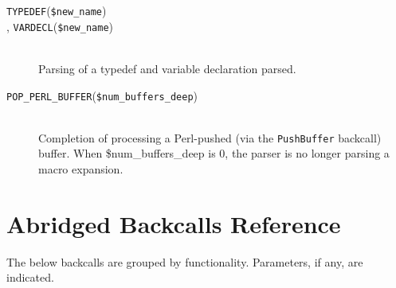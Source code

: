 \documentclass{article}
\newcommand{\Perl}{\mbox{Perl}}
\newcommand{\hook}[2]{\texttt{#1}(\texttt{#2}) \\ }
\newcommand{\shook}[1]{\texttt{#1}}
\begin{document}
\begin{description}

\item[\hook{TYPEDEF}{\$new\_\-name}, \hook{VARDECL}{\$new\_\-name}] ~ \\
  Parsing of a typedef and variable declaration parsed.

\item[\hook{POP\_PERL\_BUFFER}{\$num\_\-buffers\_\-deep}] ~ \\
  Completion of processing a \Perl{}-pushed (via the \texttt{PushBuffer}
  backcall) buffer.  When \$num\_\-buffers\_\-deep is 0, the parser is no 
  longer parsing a macro expansion.

\end{description}

\section{Abridged Backcalls Reference}
\label{sec:backcalls}

The below backcalls are grouped by functionality.  Parameters, if any,
are indicated.
\end{document}
